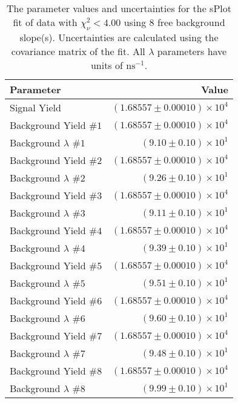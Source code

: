 
\begin{table}
    \begin{center}
        \begin{tabular}{lr}\toprule
            Parameter & Value \\\midrule
            Signal Yield & $(1.68557 \pm 0.00010) \times 10^{4}$ \\
            Background Yield $\#1$ & $(1.68557 \pm 0.00010) \times 10^{4}$ \\
            Background $\lambda$ $\#1$ & $(9.10 \pm 0.10) \times 10^{1}$ \\
            Background Yield $\#2$ & $(1.68557 \pm 0.00010) \times 10^{4}$ \\
            Background $\lambda$ $\#2$ & $(9.26 \pm 0.10) \times 10^{1}$ \\
            Background Yield $\#3$ & $(1.68557 \pm 0.00010) \times 10^{4}$ \\
            Background $\lambda$ $\#3$ & $(9.11 \pm 0.10) \times 10^{1}$ \\
            Background Yield $\#4$ & $(1.68557 \pm 0.00010) \times 10^{4}$ \\
            Background $\lambda$ $\#4$ & $(9.39 \pm 0.10) \times 10^{1}$ \\
            Background Yield $\#5$ & $(1.68557 \pm 0.00010) \times 10^{4}$ \\
            Background $\lambda$ $\#5$ & $(9.51 \pm 0.10) \times 10^{1}$ \\
            Background Yield $\#6$ & $(1.68557 \pm 0.00010) \times 10^{4}$ \\
            Background $\lambda$ $\#6$ & $(9.60 \pm 0.10) \times 10^{1}$ \\
            Background Yield $\#7$ & $(1.68557 \pm 0.00010) \times 10^{4}$ \\
            Background $\lambda$ $\#7$ & $(9.48 \pm 0.10) \times 10^{1}$ \\
            Background Yield $\#8$ & $(1.68557 \pm 0.00010) \times 10^{4}$ \\
            Background $\lambda$ $\#8$ & $(9.99 \pm 0.10) \times 10^{1}$ \\\bottomrule
        \end{tabular}
        \caption{The parameter values and uncertainties for the sPlot fit of data with $\chi^2_\nu < 4.00$ using 8 free background slope(s). Uncertainties are calculated using the covariance matrix of the fit. All $\lambda$ parameters have units of $\si{\nano\second}^{-1}$.}
    \end{center}
\end{table}

